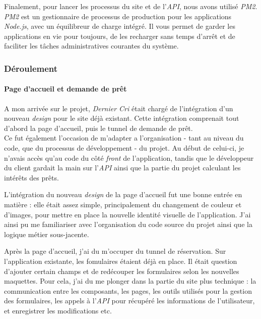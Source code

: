 Finalement, pour lancer les processus du site et de l'\emph{API}, nous
avons utilisé \emph{PM2}. \emph{PM2} est un gestionnaire de processus de
production pour les applications \emph{Node.js}, avec un équilibreur de
charge intégré. Il vous permet de garder les applications en vie pour
toujours, de les recharger sans temps d'arrêt et de faciliter les tâches
administratives courantes du système.

\bigskip

\subsubsection{Déroulement}\label{duxe9roulement-1}

\paragraph{Page d'accueil et demande de
prêt}\label{page-daccueil-et-demande-de-pruxeat}

\bigskip

A mon arrivée sur le projet, \emph{Dernier Cri} était chargé de
l'intégration d'un nouveau \emph{design} pour le site déjà existant.
Cette intégration comprenait tout d'abord la page d'accueil, puis le
tunnel de demande de prêt.\\
Ce fut également l'occasion de m'adapter a l'organisation - tant au
niveau du code, que du processus de développement - du projet. Au début
de celui-ci, je n'avais accès qu'au code du côté \emph{front} de
l'application, tandis que le développeur du client gardait la main sur
l'\emph{API} ainsi que la partie du projet calculant les intérêts des
prêts.

\bigskip

L'intégration du nouveau \emph{design} de la page d'accueil fut une
bonne entrée en matière : elle était assez simple, principalement du
changement de couleur et d'images, pour mettre en place la nouvelle
identité visuelle de l'application. J'ai ainsi pu me familiariser avec
l'organisation du code source du projet ainsi que la logique métier
sous-jacente.

\bigskip

Après la page d'accueil, j'ai du m'occuper du tunnel de réservation. Sur
l'application existante, les fomulaires étaient déjà en place. Il était
question d'ajouter certain champs et de redécouper les formulaires selon
les nouvelles maquettes. Pour cela, j'ai du me plonger dans la partie du
site plus technique : la communication entre les composants, les pages,
les outils utilisés pour la gestion des formulaires, les appels à
l'\emph{API} pour récupéré les informations de l'utilisateur, et
enregistrer les modifications etc.

